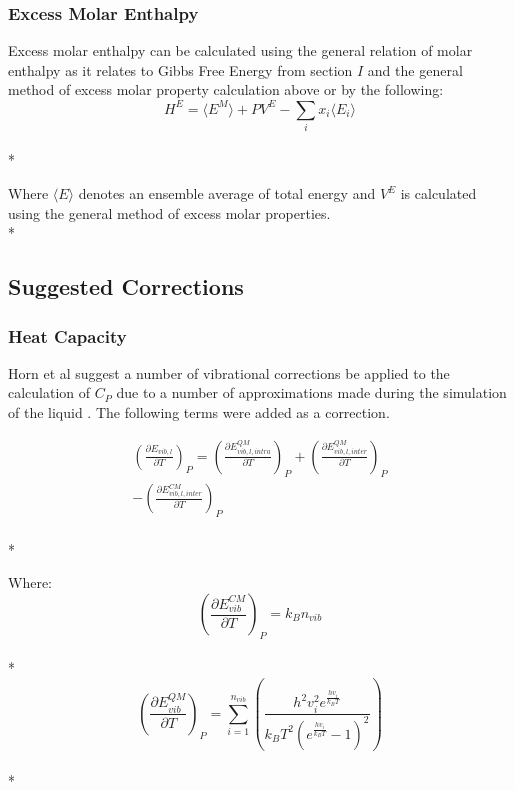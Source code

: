 \documentclass[aps,pre,twocolumn,nofootinbib,superscriptaddress,linenumbers,10pt, draft,tightenlines]{revtex4-1}
\begin{document}

\subsubsection{Excess Molar Enthalpy}
Excess molar enthalpy can be calculated using the general relation of molar enthalpy as it relates to Gibbs Free Energy from section $I$ and the general method of excess molar property calculation above or by the following\cite{hexcess}:
\begin{equation}H^E = \langle E^M \rangle + P V^E - \sum_{i} x_i \langle E_i \rangle\end{equation}\\*
 
Where $\langle E \rangle$ denotes an ensemble average of total energy and $V^E$ is calculated using the general method of excess molar properties.\\* 


\subsection{Suggested Corrections}
\subsubsection{Heat Capacity}
Horn et al suggest a number of vibrational corrections be applied to the calculation of $C_P$ due to a number of approximations made during the simulation of the liquid \cite{horn}. The following terms were added as a correction.

\begin{multline}
\left(\frac{\partial E_{vib,l}}{\partial T}\right)_{P} = \left(\frac{\partial E_{vib,l,intra}^{QM}}{\partial T}\right)_{P} + \left(\frac{\partial E_{vib,l,inter}^{QM}}{\partial T}\right)_{P} \\ - \left(\frac{\partial E_{vib,l,inter}^{CM}}{\partial T}\right)_{P}
\end{multline}\\*

Where:
\begin{equation}\left(\frac{\partial E_{vib}^{CM}}{\partial T}\right)_{P} = k_B n_{vib}\end{equation}\\*
\begin{equation}\left(\frac{\partial E_{vib}^{QM}}{\partial T}\right)_{P} = \sum_{i=1}^{n_{vib}} \left(\frac{h^2 v_{i}^2 e^{\frac{h v_{i}}{k_B T}}}{k_B T^2 \left(e^{\frac{h v_{i}}{k_B T}} - 1\right)^2}\right)\end{equation}\\*
\end{document}
